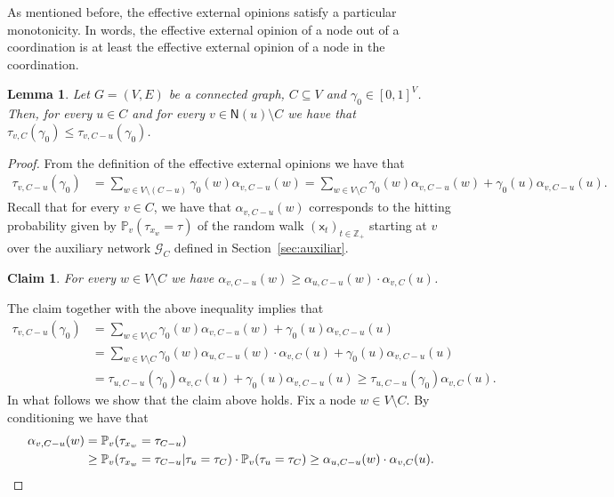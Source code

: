 \documentclass[letterpaper,11pt]{article}
\newcommand{\PP}{\mathbb{P}}
\newcommand{\calG}{\mathcal{G}}
\newcommand{\ZZ}{\mathbb{Z}}
\newcommand{\nsf}{\mathsf{N}}
\newcommand{\xsf}{\mathsf{x}}
\newtheorem{lemma}{Lemma}
\newtheorem{claim}{Claim}
\newcommand{\vvcom}[1]{\todo[color=red!25!white]{Victor: #1}}
\begin{document}
As mentioned before, the effective external opinions satisfy a particular monotonicity. 
In words, the effective external opinion of a node out of a coordination is at least the effective external opinion of a node in the coordination.

\begin{lemma}
\label{lem:mono-external}
Let $G=(V,E)$ be a connected graph, $C\subseteq V$ and $\gamma_0\in [0,1]^V$.
Then, for every $u\in C$ and for every $v\in \nsf(u)\setminus C$ we have that $\tau_{v,C}(\gamma_0)\le \tau_{v,C-u}(\gamma_0)$.
\end{lemma}

\begin{proof}
\vvcom{chequear esto}
From the definition of the effective external opinions we have that
\begin{align*}
\tau_{v,C-u}(\gamma_0)&=\sum_{w\in V\setminus (C-u)}\gamma_0(w)\alpha_{v,C-u}(w)= \sum_{w\in V\setminus C}\gamma_0(w)\alpha_{v,C-u}(w)+\gamma_0(u)\alpha_{v,C-u}(u).\end{align*}
Recall that for every $v\in C$, we have that $\alpha_{v,C-u}(w)$ corresponds to the hitting probability given by $\PP_v(\tau_{x_w}=\tau)$ of the random walk $(\xsf_t)_{t\in \ZZ_+}$ starting at $v$ over the auxiliary network $\calG_C$ defined in Section~\ref{sec:auxiliar}.
\begin{claim}
For every $w\in V\setminus C$ we have $\alpha_{v,C-u}(w)\ge \alpha_{u,C-u}(w)\cdot \alpha_{v,C}(u)$.
\end{claim}
\noindent The claim together with the above inequality implies that 
\begin{align*}
\tau_{v,C-u}(\gamma_0)&=\sum_{w\in V\setminus C}\gamma_0(w)\alpha_{v,C-u}(w)+\gamma_0(u)\alpha_{v,C-u}(u)\\
				&=\sum_{w\in V\setminus C}\gamma_0(w)\alpha_{u,C-u}(w)\cdot\alpha_{v,C}(u)+\gamma_0(u)\alpha_{v,C-u}(u)\\
				&=\tau_{u,C-u}(\gamma_0)\alpha_{v,C}(u)+\gamma_0(u)\alpha_{v,C-u}(u)\ge \tau_{u,C-u}(\gamma_0)\alpha_{v,C}(u).
\end{align*}
In what follows we show that the claim above holds.
Fix a node $w\in V\setminus C$. 
By conditioning we have that 
\begin{align*}
\alpha_{v,C-u}(w)&=\PP_v(\tau_{x_w}=\tau_{C-u})\\
			&\ge \PP_{v}(\tau_{x_w}=\tau_{C-u}|\tau_u=\tau_C)\cdot\PP_v(\tau_{u}=\tau_{C})\ge \alpha_{u,C-u}(w)\cdot\alpha_{v,C}(u).\qedhere
\end{align*}
\end{proof}
\end{document}
